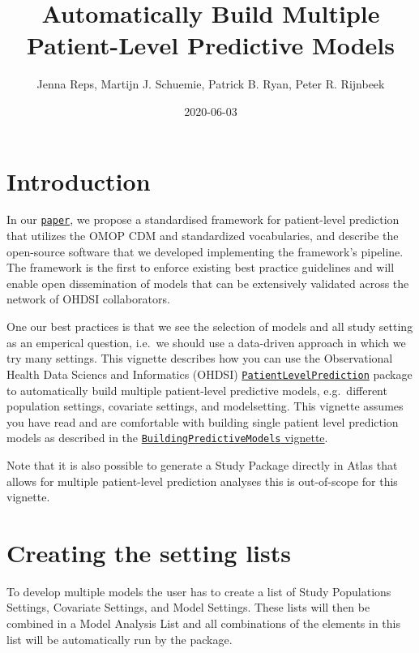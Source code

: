 \documentclass[
]{article}
\title{Automatically Build Multiple Patient-Level Predictive Models}
\author{Jenna Reps, Martijn J. Schuemie, Patrick B. Ryan, Peter R. Rijnbeek}
\date{2020-06-03}
\begin{document}
\maketitle

{
\setcounter{tocdepth}{2}
\tableofcontents
}
\hypertarget{introduction}{%
\section{Introduction}\label{introduction}}

In our
\href{https://academic.oup.com/jamia/article/25/8/969/4989437}{\texttt{paper}},
we propose a standardised framework for patient-level prediction that
utilizes the OMOP CDM and standardized vocabularies, and describe the
open-source software that we developed implementing the framework's
pipeline. The framework is the first to enforce existing best practice
guidelines and will enable open dissemination of models that can be
extensively validated across the network of OHDSI collaborators.

One our best practices is that we see the selection of models and all
study setting as an emperical question, i.e.~we should use a data-driven
approach in which we try many settings. This vignette describes how you
can use the Observational Health Data Sciencs and Informatics (OHDSI)
\href{http://github.com/OHDSI/PatientLevelPrediction}{\texttt{PatientLevelPrediction}}
package to automatically build multiple patient-level predictive models,
e.g.~different population settings, covariate settings, and
modelsetting. This vignette assumes you have read and are comfortable
with building single patient level prediction models as described in the
\href{https://github.com/OHDSI/PatientLevelPrediction/blob/master/inst/doc/BuildingPredictiveModels.pdf}{\texttt{BuildingPredictiveModels}
vignette}.

Note that it is also possible to generate a Study Package directly in
Atlas that allows for multiple patient-level prediction analyses this is
out-of-scope for this vignette.

\hypertarget{creating-the-setting-lists}{%
\section{Creating the setting lists}\label{creating-the-setting-lists}}

To develop multiple models the user has to create a list of Study
Populations Settings, Covariate Settings, and Model Settings. These
lists will then be combined in a Model Analysis List and all
combinations of the elements in this list will be automatically run by
the package.
\end{document}
